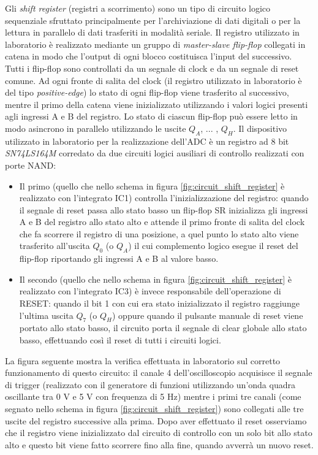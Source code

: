 \documentclass[journal]{IEEEtran}
\begin{document}
Gli \textit{shift register} (registri a scorrimento) sono un tipo di circuito logico sequenziale sfruttato principalmente per l'archiviazione di dati digitali o per la lettura in parallelo di dati trasferiti in modalità seriale. Il registro utilizzato in laboratorio è realizzato mediante un gruppo di \textit{master-slave flip-flop} collegati in catena in modo che l'output di ogni blocco costituisca l'input del successivo. Tutti i flip-flop sono controllati da un segnale di clock e da un segnale di reset comune.
Ad ogni fronte di salita del clock (il registro utilizzato in laboratorio è del tipo \textit{positive-edge}) lo stato di ogni flip-flop viene trasferito al successivo, mentre il primo della catena viene inizializzato utilizzando i valori logici presenti agli ingressi A e B del registro. Lo stato di ciascun flip-flop può essere letto in modo asincrono in parallelo utilizzando le uscite {$Q_A$, ... , $Q_H$}. Il dispositivo utilizzato in laboratorio per la realizzazione dell'ADC è un registro ad 8 bit \textit{SN74LS164M} corredato da due circuiti logici ausiliari di controllo realizzati con porte NAND:
\begin{itemize}
    \item Il primo (quello che nello schema in figura \ref{fig:circuit_shift_register} è realizzato con l'integrato IC1) controlla l'inizializzazione del registro: quando il segnale di reset passa allo stato basso un flip-flop SR inizializza gli ingressi A e B del registro allo stato alto e attende il primo fronte di salita del clock che fa scorrere il registro di una posizione, a quel punto lo stato alto viene trasferito all'uscita $Q_0$ (o $Q_A$) il cui complemento logico esegue il reset del flip-flop riportando gli ingressi A e B al valore basso. 
    \item Il secondo (quello che nello schema in figura \ref{fig:circuit_shift_register} è realizzato con l'integrato IC3) è invece responsabile dell'operazione di RESET: quando il bit 1 con cui era stato inizializzato il registro raggiunge l'ultima uscita $Q_7$ (o $Q_H$) oppure quando il pulsante manuale di reset viene portato allo stato basso, il circuito porta il segnale di clear globale allo stato basso, effettuando così il reset di tutti i circuiti logici.
\end{itemize}

La figura seguente mostra la verifica effettuata in laboratorio sul corretto funzionamento di questo circuito: il canale 4 dell'oscilloscopio acquisisce il segnale di trigger (realizzato con il generatore di funzioni utilizzando un'onda quadra oscillante tra 0 V e 5 V con frequenza di 5 Hz) mentre i primi tre canali (come segnato nello schema in figura \ref{fig:circuit_shift_register}) sono collegati alle tre uscite del registro successive alla prima. Dopo aver effettuato il reset osserviamo che il registro viene inizializzato dal circuito di controllo con un solo bit allo stato alto e questo bit viene fatto scorrere fino alla fine, quando avverrà un nuovo reset. 
\end{document}
